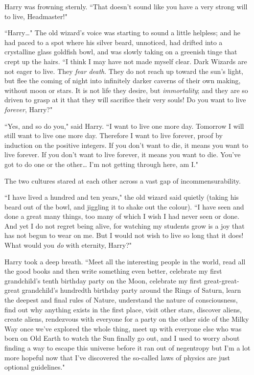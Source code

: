 Harry was frowning sternly. ``That doesn't sound like you have a very strong will to live, Headmaster!"

``Harry{\ldots}" The old wizard's voice was starting to sound a little helpless; and he had paced to a spot where his silver beard, unnoticed, had drifted into a crystalline glass goldfish bowl, and was slowly taking on a greenish tinge that crept up the hairs. ``I think I may have not made myself clear. Dark Wizards are not eager to live. They \emph{fear death}. They do not reach up toward the sun's light, but flee the coming of night into infinitely darker caverns of their own making, without moon or stars. It is not life they desire, but \emph{immortality}; and they are so driven to grasp at it that they will sacrifice their very souls! Do you want to live \emph{forever}, Harry?"

``Yes, and so do you," said Harry. ``I want to live one more day. Tomorrow I will still want to live one more day. Therefore I want to live forever, proof by induction on the positive integers. If you don't want to die, it means you want to live forever. If you don't want to live forever, it means you want to die. You've got to do one or the other{\ldots} I'm not getting through here, am I."

The two cultures stared at each other across a vast gap of incommensurability.

``I have lived a hundred and ten years," the old wizard said quietly (taking his beard out of the bowl, and jiggling it to shake out the colour). ``I have seen and done a great many things, too many of which I wish I had never seen or done. And yet I do not regret being alive, for watching my students grow is a joy that has not begun to wear on me. But I would not wish to live so long that it does! What would you \emph{do} with eternity, Harry?"

Harry took a deep breath. ``Meet all the interesting people in the world, read all the good books and then write something even better, celebrate my first grandchild's tenth birthday party on the Moon, celebrate my first great-great-great grandchild's hundredth birthday party around the Rings of Saturn, learn the deepest and final rules of Nature, understand the nature of consciousness, find out why anything exists in the first place, visit other stars, discover aliens, create aliens, rendezvous with everyone for a party on the other side of the Milky Way once we've explored the whole thing, meet up with everyone else who was born on Old Earth to watch the Sun finally go out, and I used to worry about finding a way to escape this universe before it ran out of negentropy but I'm a lot more hopeful now that I've discovered the so-called laws of physics are just optional guidelines."

